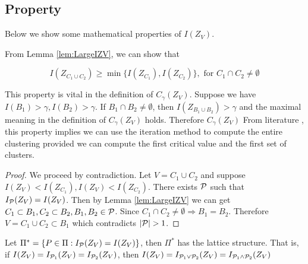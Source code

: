 \documentclass{article}
\newif\ifpublish
\begin{document}
\subsection{Property}
Below we show some mathematical properties of $I(Z_V)$.
\ifpublish


\fi

From Lemma \ref{lem:LargeIZV}, we can show that
\begin{theorem}[Laminarity]\label{thm:laminarity}
\begin{equation}\label{eq:P}
I(Z_{C_1 \cup C_2}) \geq \min\{ I(Z_{C_1}), I(Z_{C_2})\}, \textrm{ for } C_1\cap C_2 \neq \emptyset
\end{equation}
\end{theorem}
This property is vital in the definition of $C_{\gamma}(Z_V)$. Suppose we have
$I(B_1)>\gamma, I(B_2)>\gamma$. If $B_1 \cap B_2 \neq \emptyset$, then $I(Z_{B_1\cup B_2})>\gamma$ and the maximal meaning in the definition of $C_{\gamma}(Z_V)$ holds.
Therefore $C_{\gamma}(Z_V)$
From literature \cite{ic}, this property implies we can use the iteration method to compute the entire clustering
provided we can compute the first critical value and the first set of clusters.
\begin{proof}
	We proceed by contradiction. Let $V=C_1 \cup C_2$ and suppose $I(Z_V) < I(Z_{C_1}),
	I(Z_V) < I(Z_{C_2})$. There exists $\P$ such that $I_{\P}(Z_V) = I(Z_V)$.
	Then by Lemma \ref{lem:LargeIZV} we can get $C_1 \subset B_1, C_2 \subset B_2, B_1, B_2 \in
	\P$. Since $C_1 \cap C_2 \neq \emptyset \Rightarrow B_1 = B_2$. Therefore $V=C_1 \cup C_2 \subset B_1$ which contradicts $\abs{\P}>1$.
\end{proof}
\begin{theorem}\label{thm:lattice}
Let $\Pi^* =  \{ P \in \Pi: I_{\P}(Z_V) = I(Z_V)\}$, then $\Pi^*$ has the lattice structure. That is, 
if $I(Z_V) = I_{\P_1}(Z_V) = I_{\P_2}(Z_V)$, then $I(Z_V) 
=  I_{\P_1 \vee \P_2}(Z_V) = 
 I_{\P_1 \wedge \P_2}(Z_V)$
\end{theorem}
\end{document}
